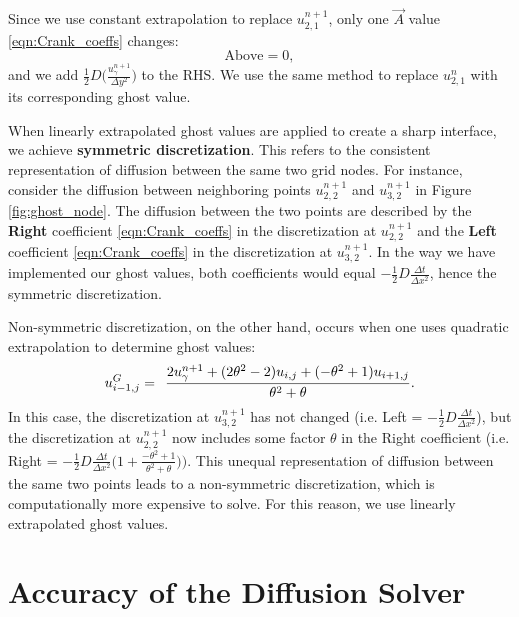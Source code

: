 \documentclass[oneside,12pt,final]{/Applications/TeX/packages/ucthesis-CA2012}
\begin{document}
\begin{mainmatter}
Since we use constant extrapolation to replace $u_{2,1}^{n+1}$, only one $\vec{A}$ value \eqref{eqn:Crank_coeffs} changes:
\begin{equation}
\text{Above} = 0,
\end{equation}
and we add $\frac{1}{2}D \bigg(\frac{u_{\gamma}^{n+1}}{\Delta y^2} \bigg)$ to the RHS. We use the same method to replace $u_{2,1}^{n}$ with its corresponding ghost value. 

When linearly extrapolated ghost values are applied to create a sharp interface, we achieve \textbf{symmetric discretization}. This refers to the consistent representation of diffusion between the same two grid nodes. For instance, consider the diffusion between neighboring points $u_{2,2}^{n+1}$ and $u_{3,2}^{n+1}$ in Figure \ref{fig:ghost_node}. The diffusion between the two points are described by the \textbf{Right} coefficient \eqref{eqn:Crank_coeffs} in the discretization at $u_{2,2}^{n+1}$ and the \textbf{Left} coefficient \eqref{eqn:Crank_coeffs} in the discretization at $u_{3,2}^{n+1}$. In the way we have implemented our ghost values, both coefficients would equal $-\frac{1}{2}D\frac{\Delta t}{\Delta x^2}$, hence the symmetric discretization.

Non-symmetric discretization, on the other hand, occurs when one uses quadratic extrapolation to determine ghost values:
\begin{equation}
u^G_{i-1,j} = \>\> \frac{2 u_{\gamma}^{n+1} + (2 \theta^2 - 2) u_{i,j} + (-\theta^2 + 1)u_{i+1,j}}{\theta^2 + \theta}.\\
\end{equation}
In this case, the discretization at $u_{3,2}^{n+1}$ has not changed (i.e. Left = $-\frac{1}{2}D\frac{\Delta t}{\Delta x^2}$), but the discretization at $u_{2,2}^{n+1}$ now includes some factor $\theta$ in the Right coefficient \bigg(i.e. Right = $-\frac{1}{2}D\frac{\Delta t}{\Delta x^2} \bigg(1 + \frac{-\theta^2 + 1}{\theta^2 + \theta} \bigg)\bigg)$. This unequal representation of diffusion between the same two points leads to a non-symmetric discretization, which is computationally more expensive to solve. For this reason, we use linearly extrapolated ghost values.

\section{Accuracy of the Diffusion Solver}


\end{mainmatter}
\end{document}
